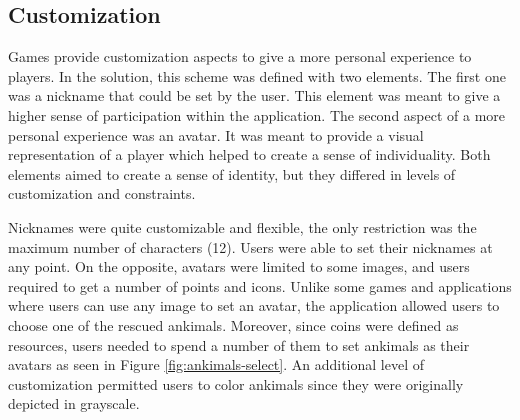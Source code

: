 \subsection{Customization}
Games provide customization aspects to give a more personal experience to players. In the solution, this scheme was defined with two elements. The first one was a nickname that could be set by the user. This element was meant to give a higher sense of participation within the application. The second aspect of a more personal experience was an avatar. It was meant to provide a visual representation of a player which helped to create a sense of individuality. Both elements aimed to create a sense of identity, but they differed in levels of customization and constraints.

Nicknames were quite customizable and flexible, the only restriction was the maximum number of characters (12). Users were able to set their nicknames at any point. On the opposite, avatars were limited to some images, and users required to get a number of points and icons. Unlike some games and applications where users can use any image to set an avatar, the application allowed users to choose one of the rescued ankimals. Moreover, since coins were defined as resources, users needed to spend a number of them to set ankimals as their avatars as seen in Figure \ref{fig:ankimals-select}. An additional level of customization permitted users to color ankimals since they were originally depicted in grayscale.

